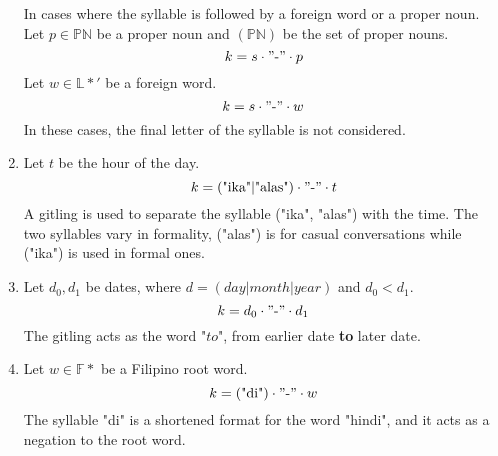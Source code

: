 \begin{enumerate}
          In cases where the syllable is followed by a foreign word or a proper noun. Let \(p \in \mathbb{PN}\) be a proper noun and \((\mathbb{PN})\) be the set of proper nouns.
          \[
              k = s \cdot "\text{-}" \cdot p
          \]
          Let \(w \in \mathbb{L*'}\) be a foreign word.
          \[
              k = s \cdot "\text{-}" \cdot w
          \]
          In these cases, the final letter of the syllable is not considered.
    \item
          Let $t$ be the hour of the day.
          \[
              k = (\text{"ika"}|\text{"alas"}) \cdot "\text{-}" \cdot t
          \]
          A gitling is used to separate the syllable ("ika", "alas") with the time. The two syllables vary in formality, ("alas") is for casual conversations while ("ika") is used in formal ones.
    \item
          Let \(d_0, d_1\) be dates, where \(d = (day | month | year)\) and \(d_0 < d_1\).
          \[
              k = d_0 \cdot "\text{-}" \cdot d_1
          \]
          The gitling acts as the word "$to$", from earlier date \textbf{to} later date.
    \item
          Let \(w \in \mathbb{F}*\) be a Filipino root word.
          \[
              k = (\text{"di"}) \cdot "\text{-}" \cdot w
          \]
          The syllable "di" is a shortened format for the word "hindi", and it acts as a negation to the root word.


\end{enumerate}